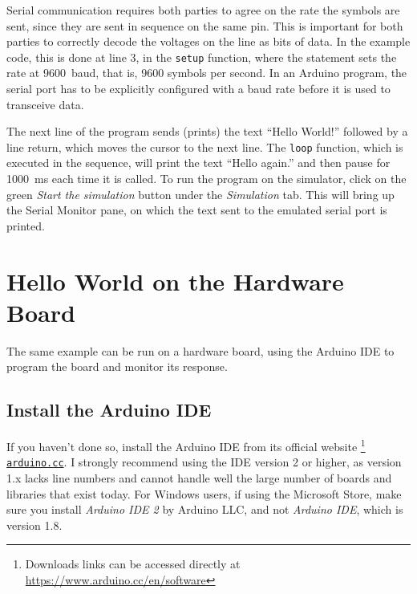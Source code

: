 Serial communication requires both parties to agree on the rate the symbols are sent, since they are sent in sequence on the same pin.
This is important for both parties to correctly decode the voltages on the line as bits of data.
In the example code, this is done at line 3, in the \texttt{setup} function, where the statement  sets the rate at \SI{9600}{baud}, that is, \num{9600} symbols per second.
In an Arduino program, the serial port has to be explicitly configured with a baud rate before it is used to transceive data.

The next line of the program sends (prints) the text ``Hello World!'' followed by a line return, which moves the cursor to the next line.
The \texttt{loop} function, which is executed in the sequence, will print the text ``Hello again.'' and then pause for \SI{1000}{ms} each time it is called.
To run the program on the simulator, click on the green \emph{Start the simulation} button under the \emph{Simulation} tab.
This will bring up the Serial Monitor pane, on which the text sent to the emulated serial port is printed.

\section{Hello World on the Hardware Board}

The same example can be run on a hardware board, using the Arduino IDE to program the board and monitor its response.

\subsection{Install the Arduino IDE}
If you haven't done so, install the Arduino IDE from its official website%
\footnote{Downloads links can be accessed directly at \url{https://www.arduino.cc/en/software}}
\texttt{\href{https://www.arduino.cc/en/software}{arduino.cc}}.
I strongly recommend using the IDE version 2 or higher, as version 1.x lacks line numbers and cannot handle  well the large number of boards and libraries that exist today.
For Windows users, if using the Microsoft Store, make sure you install \emph{Arduino IDE 2} by Arduino LLC, and not \emph{Arduino IDE}, which is version 1.8.

